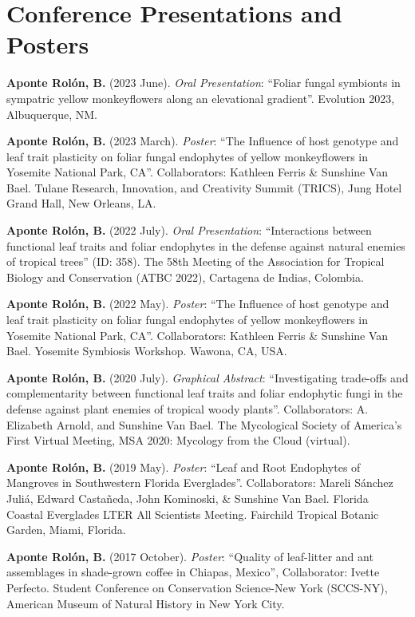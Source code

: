 \documentclass[11pt,a4paper,]{awesome-cv}
\begin{document}
\hypertarget{conference-presentations-and-posters}{%
\section{\texorpdfstring{ Conference
Presentations and
Posters}{ Conference Presentations and Posters}}\label{conference-presentations-and-posters}}

\textbf{Aponte Rolón, B.} (2023 June). \emph{Oral Presentation}:
``Foliar fungal symbionts in sympatric yellow monkeyflowers along an
elevational gradient''. Evolution 2023, Albuquerque, NM.

\textbf{Aponte Rolón, B.} (2023 March). \emph{Poster}: ``The Influence
of host genotype and leaf trait plasticity on foliar fungal endophytes
of yellow monkeyflowers in Yosemite National Park, CA''. Collaborators:
Kathleen Ferris \& Sunshine Van Bael. Tulane Research, Innovation, and
Creativity Summit (TRICS), Jung Hotel Grand Hall, New Orleans, LA.

\textbf{Aponte Rolón, B.} (2022 July). \emph{Oral Presentation}:
``Interactions between functional leaf traits and foliar endophytes in
the defense against natural enemies of tropical trees'' (ID: 358). The
58th Meeting of the Association for Tropical Biology and Conservation
(ATBC 2022), Cartagena de Indias, Colombia.

\textbf{Aponte Rolón, B.} (2022 May). \emph{Poster}: ``The Influence of
host genotype and leaf trait plasticity on foliar fungal endophytes of
yellow monkeyflowers in Yosemite National Park, CA''. Collaborators:
Kathleen Ferris \& Sunshine Van Bael. Yosemite Symbiosis Workshop.
Wawona, CA, USA.

\textbf{Aponte Rolón, B.} (2020 July). \emph{Graphical Abstract}:
``Investigating trade-offs and complementarity between functional leaf
traits and foliar endophytic fungi in the defense against plant enemies
of tropical woody plants''. Collaborators: A. Elizabeth Arnold, and
Sunshine Van Bael. The Mycological Society of America's First Virtual
Meeting, MSA 2020: Mycology from the Cloud (virtual).

\textbf{Aponte Rolón, B.} (2019 May). \emph{Poster}: ``Leaf and Root
Endophytes of Mangroves in Southwestern Florida Everglades''.
Collaborators: Mareli Sánchez Juliá, Edward Castañeda, John Kominoski,
\& Sunshine Van Bael. Florida Coastal Everglades LTER All Scientists
Meeting. Fairchild Tropical Botanic Garden, Miami, Florida.

\textbf{Aponte Rolón, B.} (2017 October). \emph{Poster}: ``Quality of
leaf-litter and ant assemblages in shade-grown coffee in Chiapas,
Mexico'', Collaborator: Ivette Perfecto. Student Conference on
Conservation Science-New York (SCCS-NY), American Museum of Natural
History in New York City.
\end{document}
